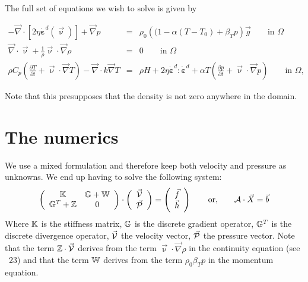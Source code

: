 The full set of equations we wish to solve is given by

\begin{eqnarray}
-\vec\nabla \cdot \left[2\eta \dot{\bm \varepsilon}^d(\vec{\upnu}) \right] 
+ \vec\nabla p &=& \rho_0 \left((1 - \alpha(T-T_0) + \beta_T p \right) \vec{g} 
\quad\quad \textrm{in $\Omega$}  \label{eq:stokes-1a_} \\
\vec\nabla \cdot \vec{\upnu} + \frac{1}{\rho} \vec{\upnu} \cdot {\vec\nabla}\rho&=&0 
\quad\quad  \textrm{in $\Omega$}   \label{eq:stokes-2a_} \\
\rho C_p \left(\frac{\partial T}{\partial t} + \vec\upnu \cdot \vec\nabla T \right) 
- \vec\nabla\cdot k \vec\nabla T   &=& 
\rho H  +  2\eta \dot{\bm \varepsilon}^d : \dot{\bm \varepsilon}^d    
+\alpha T \left( \frac{\partial p}{\partial t}+  \vec\upnu \cdot \vec\nabla p \right) 
\quad\quad   \textrm{in $\Omega$},
\label{eq:temperature_}
\end{eqnarray}

Note that this presupposes that the density is not zero anywhere in the domain.

\section*{The numerics}

We use a mixed formulation and therefore  
keep both velocity and pressure as unknowns. We end up having to solve 
the following system:
\[
\left( \begin{array}{cc}
{\mathbb{K}} & {\mathbb{G}}+{\mathbb{W}} \\ {\mathbb{G}}^T+{\mathbb{Z}} & 0 
\end{array} \right)
\cdot
\left( \begin{array}{c}
\vec{\cal V} \\ \vec{\cal P}
\end{array} \right)
=
\left( \begin{array}{c}
\vec{f} \\ \vec{h}
\end{array} \right)
\quad\quad
{\rm or,}
\quad\quad
{\cal A} \cdot \vec{X} = \vec{b}
\]
Where ${\mathbb{K}}$ is the stiffness matrix, ${\mathbb{G}}$ is the discrete gradient operator, 
${\mathbb{G}}^T$ is the discrete divergence operator, $\vec{\cal V}$ the velocity vector, 
$\vec{\cal P}$ the pressure vector.
Note that the term ${\mathbb{Z}}\cdot \vec{\cal V}$ derives from the 
term $\vec\upnu \cdot \vec{\nabla} \rho$ in the continuity equation
(see \stone~23) and that the term ${\mathbb{W}}$ derives from the term $\rho_0 \beta_T p$ in the momentum equation.

